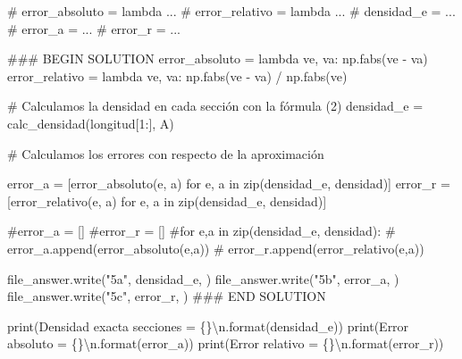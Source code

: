 \documentclass[
  letterpaper,
  DIV=11,
  numbers=noendperiod]{scrreprt}
\newenvironment{Shaded}{\begin{snugshade}}{\end{snugshade}}
\newcommand{\BuiltInTok}[1]{\textcolor[rgb]{0.00,0.23,0.31}{#1}}
\newcommand{\CharTok}[1]{\textcolor[rgb]{0.13,0.47,0.30}{#1}}
\newcommand{\CommentTok}[1]{\textcolor[rgb]{0.37,0.37,0.37}{#1}}
\newcommand{\ControlFlowTok}[1]{\textcolor[rgb]{0.00,0.23,0.31}{#1}}
\newcommand{\DecValTok}[1]{\textcolor[rgb]{0.68,0.00,0.00}{#1}}
\newcommand{\KeywordTok}[1]{\textcolor[rgb]{0.00,0.23,0.31}{#1}}
\newcommand{\NormalTok}[1]{\textcolor[rgb]{0.00,0.23,0.31}{#1}}
\newcommand{\OperatorTok}[1]{\textcolor[rgb]{0.37,0.37,0.37}{#1}}
\newcommand{\RegionMarkerTok}[1]{\textcolor[rgb]{0.00,0.23,0.31}{#1}}
\newcommand{\SpecialCharTok}[1]{\textcolor[rgb]{0.37,0.37,0.37}{#1}}
\newcommand{\StringTok}[1]{\textcolor[rgb]{0.13,0.47,0.30}{#1}}
\begin{document}
\begin{Shaded}
\begin{Highlighting}[]
\CommentTok{\# error\_absoluto = lambda ...}
\CommentTok{\# error\_relativo = lambda ...}
\CommentTok{\# densidad\_e = ...}
\CommentTok{\# error\_a = ...}
\CommentTok{\# error\_r = ...}

\CommentTok{\#\#\# }\RegionMarkerTok{BEGIN}\CommentTok{ SOLUTION}
\NormalTok{error\_absoluto }\OperatorTok{=} \KeywordTok{lambda}\NormalTok{ ve, va: np.fabs(ve }\OperatorTok{{-}}\NormalTok{ va)}
\NormalTok{error\_relativo }\OperatorTok{=} \KeywordTok{lambda}\NormalTok{ ve, va: np.fabs(ve }\OperatorTok{{-}}\NormalTok{ va) }\OperatorTok{/}\NormalTok{ np.fabs(ve)}

\CommentTok{\# Calculamos la densidad en cada sección con la fórmula (2)}
\NormalTok{densidad\_e }\OperatorTok{=}\NormalTok{ calc\_densidad(longitud[}\DecValTok{1}\NormalTok{:], A)}

\CommentTok{\# Calculamos los errores con respecto de la aproximación}

\NormalTok{error\_a }\OperatorTok{=}\NormalTok{ [error\_absoluto(e, a) }\ControlFlowTok{for}\NormalTok{ e, a }\KeywordTok{in} \BuiltInTok{zip}\NormalTok{(densidad\_e, densidad)]}
\NormalTok{error\_r }\OperatorTok{=}\NormalTok{ [error\_relativo(e, a) }\ControlFlowTok{for}\NormalTok{ e, a }\KeywordTok{in} \BuiltInTok{zip}\NormalTok{(densidad\_e, densidad)]}

\CommentTok{\#error\_a = []}
\CommentTok{\#error\_r = []}
\CommentTok{\#for e,a in zip(densidad\_e, densidad):}
\CommentTok{\#    error\_a.append(error\_absoluto(e,a))}
\CommentTok{\#    error\_r.append(error\_relativo(e,a))}
    
\NormalTok{file\_answer.write(}\StringTok{"5a"}\NormalTok{, densidad\_e, }\StringTok{\textquotesingle{}\textquotesingle{}}\NormalTok{)}
\NormalTok{file\_answer.write(}\StringTok{"5b"}\NormalTok{, error\_a, }\StringTok{\textquotesingle{}\textquotesingle{}}\NormalTok{)}
\NormalTok{file\_answer.write(}\StringTok{"5c"}\NormalTok{, error\_r, }\StringTok{\textquotesingle{}\textquotesingle{}}\NormalTok{)}
\CommentTok{\#\#\# }\RegionMarkerTok{END}\CommentTok{ SOLUTION}

\BuiltInTok{print}\NormalTok{(}\StringTok{\textquotesingle{}Densidad exacta secciones = }\SpecialCharTok{\{\}}\CharTok{\textbackslash{}n}\StringTok{\textquotesingle{}}\NormalTok{.}\BuiltInTok{format}\NormalTok{(densidad\_e))}
\BuiltInTok{print}\NormalTok{(}\StringTok{\textquotesingle{}Error absoluto = }\SpecialCharTok{\{\}}\CharTok{\textbackslash{}n}\StringTok{\textquotesingle{}}\NormalTok{.}\BuiltInTok{format}\NormalTok{(error\_a))}
\BuiltInTok{print}\NormalTok{(}\StringTok{\textquotesingle{}Error relativo = }\SpecialCharTok{\{\}}\CharTok{\textbackslash{}n}\StringTok{\textquotesingle{}}\NormalTok{.}\BuiltInTok{format}\NormalTok{(error\_r))}
\end{Highlighting}
\end{Shaded}
\end{document}
